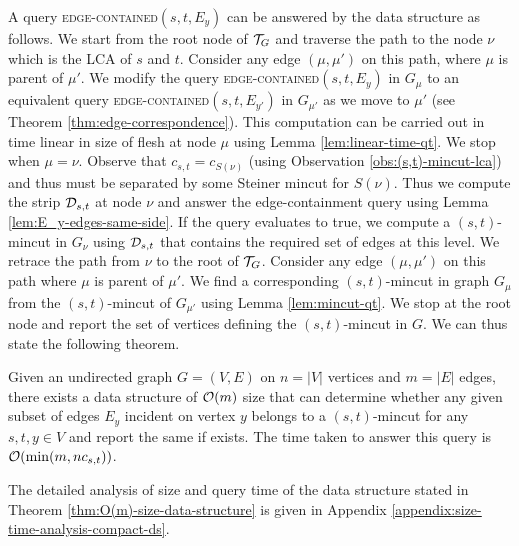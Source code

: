 A query \textsc{edge-contained}$(s,t,E_y)$ can be answered by the data structure as follows. We start from the root node of ${\cal T}_G$ and traverse the path to the node $\nu$ which is the LCA of $s$ and $t$. Consider any edge $(\mu,\mu')$ on this path, where $\mu$ is parent of $\mu'$. We modify the query \textsc{edge-contained}$(s,t,E_y)$ in $G_{\mu}$ to an equivalent query \textsc{edge-contained}$(s,t,E_{y'})$ in $G_{\mu'}$ as we move to $\mu'$ (see Theorem \ref{thm:edge-correspondence}). This computation can be carried out in time linear in size of flesh at node $\mu$ using Lemma \ref{lem:linear-time-qt}. We stop when $\mu = \nu$. Observe that $c_{s,t} = c_{S(\nu)}$ (using Observation \ref{obs:(s,t)-mincut-lca}) and thus must be separated by some Steiner mincut for $S(\nu)$.
Thus we compute the strip ${\cal D}_{s,t}$ at node $\nu$ and answer the edge-containment query using Lemma \ref{lem:E_y-edges-same-side}. If the query evaluates to true, we compute a $(s,t)$-mincut in $G_\nu$ using ${\cal D}_{s,t}$ that contains the required set of edges at this level. We retrace the path from $\nu$ to the root of ${\cal T}_G$.
Consider any edge $(\mu,\mu')$ on this path where $\mu$ is parent of $\mu'$. We find a corresponding $(s,t)$-mincut in graph $G_\mu$ from the $(s,t)$-mincut of $G_{\mu'}$ using Lemma \ref{lem:mincut-qt}. We stop at the root node and report the set of vertices defining the $(s,t)$-mincut in $G$.
We can thus state the following theorem.

\begin{theorem}
Given an undirected graph $G=(V,E)$ on $n=|V|$ vertices and $m=|E|$ edges, there exists a data structure of ${\cal O}(m)$ size that can determine whether any given subset of edges $E_y$ incident on vertex $y$ belongs to a $(s,t)$-mincut for any $s,t,y\in V$ and report the same if exists. The time taken to answer this query is ${\cal O}(\min(m,nc_{s,t}))$.
\label{thm:O(m)-size-data-structure}
\end{theorem}

The detailed analysis of size and query time of the data structure stated in Theorem \ref{thm:O(m)-size-data-structure} is given in Appendix \ref{appendix:size-time-analysis-compact-ds}.

